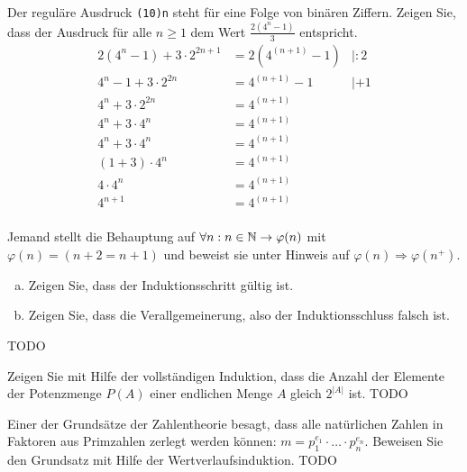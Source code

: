 \begin{card}
  Der reguläre Ausdruck \texttt{(10){n}} steht für eine Folge von binären Ziffern. Zeigen Sie, dass der Ausdruck für alle
  $n \geq 1$ dem Wert $\frac{2(4^n - 1)}{3}$ entspricht.
  \hr
  \begin{align*}
    2(4^{n} - 1) + 3 \cdot 2^{2n+1} &= 2(4^{(n+1)} - 1) & |:2 \\
    4^{n} - 1 + 3 \cdot 2^{2n} &= 4^{(n+1)} - 1 & |+1 \\
    4^{n} + 3 \cdot 2^{2n} &= 4^{(n+1)} & \\
    4^{n} + 3 \cdot 4^n &= 4^{(n+1)} & \\
    4^{n} + 3 \cdot 4^n &= 4^{(n+1)} & \\
    (1+3) \cdot 4^{n} &= 4^{(n+1)} & \\
    4 \cdot 4^{n} &= 4^{(n+1)} & \\
    4^{n+1} &= 4^{(n+1)} & \\
  \end{align*}
\end{card}

\begin{card}
  Jemand stellt die Behauptung auf $\forall n : n \in \mathbb{N} \rightarrow \varphi(n)$ mit $\varphi(n) = (n+2 = n+1)$ und beweist sie unter Hinweis auf $\varphi(n) \Rightarrow \varphi(n^+)$.
  \begin{enumerate}[a)]
    \item Zeigen Sie, dass der Induktionsschritt gültig ist.
    \item Zeigen Sie, dass die Verallgemeinerung, also der Induktionsschluss falsch ist.
  \end{enumerate}
  \hr
  TODO
\end{card}

\begin{card}
  Zeigen Sie mit Hilfe der vollständigen Induktion, dass die Anzahl der Elemente der Potenzmenge $P(A)$ einer endlichen
  Menge $A$ gleich $2^{|A|}$ ist.
  \hr
  TODO
\end{card}

\begin{card}
  Einer der Grundsätze der Zahlentheorie besagt, dass alle natürlichen Zahlen in Faktoren aus Primzahlen zerlegt werden
  können: $m = p_1^{e_1} \cdot \ldots \cdot p_n^{e_n}$. Beweisen Sie den Grundsatz mit Hilfe der Wertverlaufsinduktion.
  \hr
  TODO
\end{card}

